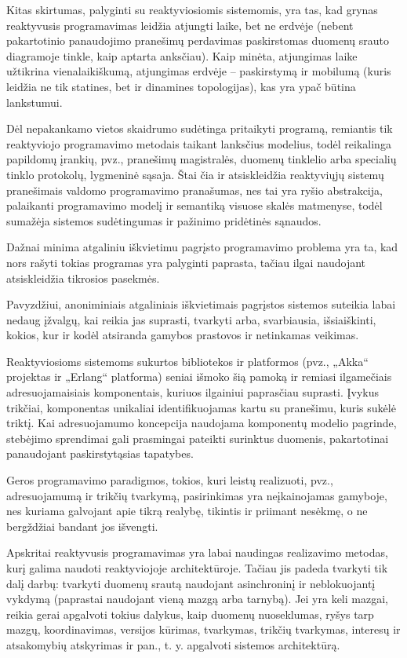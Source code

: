 Kitas skirtumas, palyginti su reaktyviosiomis sistemomis, yra tas, kad grynas reaktyvusis programavimas leidžia atjungti laike, bet ne erdvėje (nebent pakartotinio panaudojimo pranešimų perdavimas paskirstomas duomenų srauto diagramoje tinkle, kaip aptarta anksčiau). Kaip minėta, atjungimas laike užtikrina vienalaikiškumą, atjungimas erdvėje – paskirstymą ir mobilumą (kuris leidžia ne tik statines, bet ir dinamines topologijas), kas yra ypač būtina lankstumui.

Dėl nepakankamo vietos skaidrumo sudėtinga pritaikyti programą, remiantis tik reaktyviojo programavimo metodais taikant lanksčius modelius, todėl reikalinga papildomų įrankių, pvz., pranešimų magistralės, duomenų tinklelio arba specialių tinklo protokolų, lygmeninė sąsaja. Štai čia ir atsiskleidžia reaktyviųjų sistemų pranešimais valdomo programavimo pranašumas, nes tai yra ryšio abstrakcija, palaikanti programavimo modelį ir semantiką visuose skalės matmenyse, todėl sumažėja sistemos sudėtingumas ir pažinimo pridėtinės sąnaudos.

Dažnai minima atgaliniu iškvietimu pagrįsto programavimo problema yra ta, kad nors rašyti tokias programas yra palyginti paprasta, tačiau ilgai naudojant atsiskleidžia tikrosios pasekmės.

Pavyzdžiui, anoniminiais atgaliniais iškvietimais pagrįstos sistemos suteikia labai nedaug įžvalgų, kai reikia jas suprasti, tvarkyti arba, svarbiausia, išsiaiškinti, kokios, kur ir kodėl atsiranda gamybos prastovos ir netinkamas veikimas.

Reaktyviosioms sistemoms sukurtos bibliotekos ir platformos (pvz., „Akka“ projektas ir „Erlang“ platforma) seniai išmoko šią pamoką ir remiasi ilgamečiais adresuojamaisiais komponentais, kuriuos ilgainiui paprasčiau suprasti. Įvykus trikčiai, komponentas unikaliai identifikuojamas kartu su pranešimu, kuris sukėlė triktį. Kai adresuojamumo koncepcija naudojama komponentų modelio pagrinde, stebėjimo sprendimai gali prasmingai pateikti surinktus duomenis, pakartotinai panaudojant paskirstytąsias tapatybes.

Geros programavimo paradigmos, tokios, kuri leistų realizuoti, pvz., adresuojamumą ir trikčių tvarkymą, pasirinkimas yra neįkainojamas gamyboje, nes kuriama galvojant apie tikrą realybę, tikintis ir priimant nesėkmę, o ne bergždžiai bandant jos išvengti.

Apskritai reaktyvusis programavimas yra labai naudingas realizavimo metodas, kurį galima naudoti reaktyviojoje architektūroje. Tačiau jis padeda tvarkyti tik dalį darbų: tvarkyti duomenų srautą naudojant asinchroninį ir neblokuojantį vykdymą (paprastai naudojant vieną mazgą arba tarnybą). Jei yra keli mazgai, reikia gerai apgalvoti tokius dalykus, kaip duomenų nuoseklumas, ryšys tarp mazgų, koordinavimas, versijos kūrimas, tvarkymas, trikčių tvarkymas, interesų ir atsakomybių atskyrimas ir pan., t. y. apgalvoti sistemos architektūrą.

